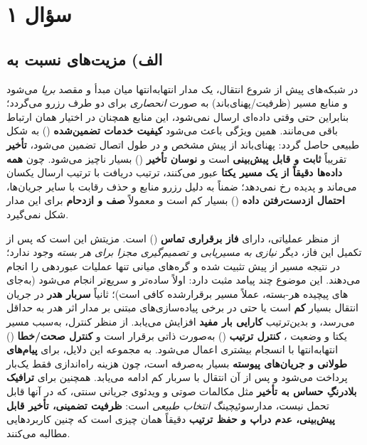 \section{سؤال ۱}

\subsection{الف) مزیت‌های  نسبت به }
در شبکه‌های  پیش از شروع انتقال، یک مدار انتها‌به‌انتها میان مبدأ و مقصد \emph{برپا} می‌شود و منابع مسیر (ظرفیت/پهنای‌باند) به صورت \emph{انحصاری} برای دو طرف رزرو می‌گردد؛ بنابراین حتی وقتی داده‌ای ارسال نمی‌شود، این منابع همچنان در اختیار همان ارتباط باقی می‌مانند. همین ویژگی باعث می‌شود \textbf{کیفیت خدمات تضمین‌شده} () به شکل طبیعی حاصل گردد: پهنای‌باند از پیش مشخص و در طول اتصال تضمین می‌شود، \textbf{تأخیر} تقریباً \textbf{ثابت و قابل پیش‌بینی} است و \textbf{نوسان تأخیر} () بسیار ناچیز می‌شود. چون \textbf{همه داده‌ها دقیقاً از یک مسیر یکتا} عبور می‌کنند، ترتیب دریافت با ترتیب ارسال یکسان می‌ماند و پدیده  رخ نمی‌دهد؛ ضمناً به دلیل رزرو منابع و حذف رقابت با سایر جریان‌ها، \textbf{احتمال از‌دست‌رفتن داده} () بسیار کم است و معمولاً \textbf{صف و ازدحام} برای این مدار شکل نمی‌گیرد.

از منظر عملیاتی،  دارای \textbf{فاز برقراری تماس} () است. مزیتش این است که پس از تکمیل این فاز، دیگر \emph{نیازی به مسیریابی و تصمیم‌گیری مجزا برای هر بسته} وجود ندارد؛ در نتیجه مسیر از پیش تثبیت شده و گره‌های میانی تنها عملیات عبوردهی را انجام می‌دهند. این موضوع چند پیامد مثبت دارد: اولاً  ساده‌تر و سریع‌تر انجام می‌شود (به‌جای های پیچیده هر-بسته، عملاً  مسیر برقرارشده کافی است)؛ ثانیاً \textbf{سربار هدر} در جریان انتقال بسیار \textbf{کم} است یا حتی در برخی پیاده‌سازی‌های مبتنی بر مدار اثر هدر به حداقل می‌رسد، و بدین‌ترتیب \textbf{کارایی بار مفید} افزایش می‌یابد. از منظر کنترل، به‌سبب مسیر یکتا و وضعیت ، \textbf{کنترل ترتیب} () به‌صورت ذاتی برقرار است و \textbf{کنترل صحت/خطا} () انتها‌به‌انتها با انسجام بیشتری اعمال می‌شود. به مجموعه این دلایل،  برای \textbf{پیام‌های طولانی و جریان‌های پیوسته} بسیار به‌صرفه است، چون هزینه راه‌اندازی فقط یک‌بار پرداخت می‌شود و پس از آن انتقال با سربار کم ادامه می‌یابد. همچنین برای \textbf{ترافیک بلادرنگِ حساس به تأخیر} مثل مکالمات صوتی و ویدئوی جریانی سنتی، که در آنها  قابل تحمل نیست، مدارسوئیچینگ \emph{انتخاب طبیعی} است: \textbf{ظرفیت تضمینی، تأخیر قابل پیش‌بینی، عدم دراپ و حفظ ترتیب} دقیقاً همان چیزی است که چنین کاربردهایی مطالبه می‌کنند.

